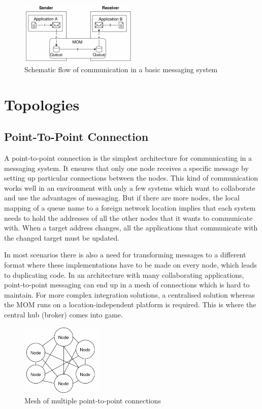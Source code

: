 \begin{figure}[H]
    \centering
    \includegraphics[width=0.5\textwidth]{images/mom-schema.png}
    \caption{Schematic flow of communication in a basic messaging system }
    \label{fig:message-oriented-middleware}
\end{figure}

\section{Topologies}
\subsection{Point-To-Point Connection}
\label{intro-messaging-pointtopoint}
A point-to-point connection is the simplest architecture for communicating in a
messaging system. It ensures that only one node receives a specific message by
setting up particular connections between the nodes. This kind of
communication works well in an environment with only a few systems which want to
collaborate and use the advantages of messaging. But if there are more
nodes, the local mapping of a queue name to a foreign network location
implies that each system needs to hold the addresses of all the other nodes that it
wants to communicate with. When a target address changes, all the applications that
communicate with the changed target must be updated. 

In most scenarios there is also a need for transforming messages to a different
format where these implementations have to be made on every node, which leads to
duplicating code. In an architecture with many collaborating applications,
point-to-point messaging can end up in a mesh of connections which is hard to
maintain.  For more complex integration solutions, a centralised solution
whereas the MOM runs on a location-independent platform is required. This is
where the central hub (broker) comes into game. \cite{MSDNIntegration}

\begin{figure}[H]
    \centering
    \includegraphics[width=0.35\textwidth]{images/point-to-point-messaging.png}
    \caption{Mesh of multiple point-to-point connections}
    \label{fig:point-to-point-messaging}
\end{figure}

